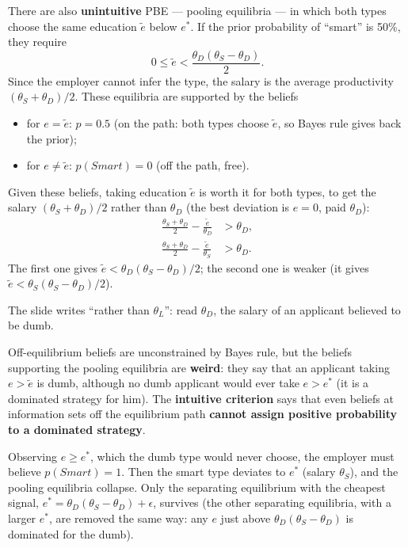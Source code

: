 \documentclass[11pt,a4paper,openany]{book}
\begin{document}
\begin{propbox}[title=Pooling equilibria]
There are also \textbf{unintuitive} PBE --- pooling equilibria --- in which both types choose
the same education $\tilde{e}$ below $e^*$. If the prior probability of ``smart'' is 50\%,
they require
\[
0 \le \tilde{e} < \frac{\theta_D(\theta_S - \theta_D)}{2}.
\]
Since the employer cannot infer the type, the salary is the average productivity
$(\theta_S + \theta_D)/2$. These equilibria are supported by the beliefs
\begin{itemize}
  \item for $e = \tilde{e}$: $p = 0.5$ (on the path: both types choose $\tilde{e}$, so Bayes
        rule gives back the prior);
  \item for $e \neq \tilde{e}$: $p(Smart) = 0$ (off the path, free).
\end{itemize}
Given these beliefs, taking education $\tilde{e}$ is worth it for both types, to get the
salary $(\theta_S + \theta_D)/2$ rather than $\theta_D$ (the best deviation is $e = 0$, paid
$\theta_D$):
\begin{align*}
\frac{\theta_S + \theta_D}{2} - \frac{\tilde{e}}{\theta_D} &> \theta_D, \\
\frac{\theta_S + \theta_D}{2} - \frac{\tilde{e}}{\theta_S} &> \theta_D.
\end{align*}
The first one gives $\tilde{e} < \theta_D(\theta_S - \theta_D)/2$; the second one is weaker
(it gives $\tilde{e} < \theta_S(\theta_S - \theta_D)/2$).
\end{propbox}

\begin{warnbox}[title=Typo on the slides]
The slide writes ``rather than $\theta_L$'': read $\theta_D$, the salary of an applicant
believed to be dumb.
\end{warnbox}

\begin{defnbox}[title=Intuitive criterion]
Off-equilibrium beliefs are unconstrained by Bayes rule, but the beliefs supporting the
pooling equilibria are \textbf{weird}: they say that an applicant taking $e > \tilde{e}$ is
dumb, although no dumb applicant would ever take $e > e^*$ (it is a dominated strategy for
him). The \textbf{intuitive criterion} says that even beliefs at information sets off the
equilibrium path \textbf{cannot assign positive probability to a dominated strategy}.
\end{defnbox}

\begin{propbox}[title=The intuitive criterion kills the pooling equilibria]
Observing $e \ge e^*$, which the dumb type would never choose, the employer must believe
$p(Smart) = 1$. Then the smart type deviates to $e^*$ (salary $\theta_S$), and the pooling
equilibria collapse. Only the separating equilibrium with the cheapest signal, $e^* =
\theta_D(\theta_S - \theta_D) + \epsilon$, survives (the other separating equilibria, with a
larger $e^*$, are removed the same way: any $e$ just above $\theta_D(\theta_S - \theta_D)$ is
dominated for the dumb).
\end{propbox}
\end{document}

